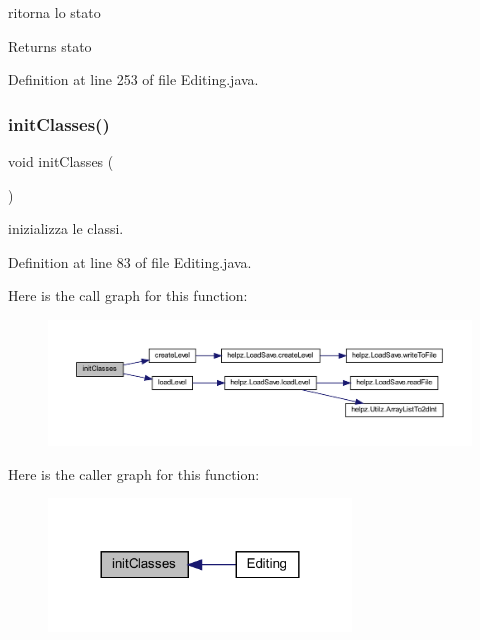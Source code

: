 ritorna lo stato 

\begin{DoxyReturn}{Returns}
stato 
\end{DoxyReturn}


Definition at line 253 of file Editing.\+java.

\mbox{\label{classscenes_1_1_editing_afe125d345675ffefe8da7e96d39773f3}} 
\subsubsection{\texorpdfstring{init\+Classes()}{initClasses()}}
{\footnotesize\ttfamily void init\+Classes (\begin{DoxyParamCaption}{ }\end{DoxyParamCaption})}



inizializza le classi. 



Definition at line 83 of file Editing.\+java.

Here is the call graph for this function\+:\nopagebreak
\begin{figure}[H]
\begin{center}
\leavevmode
\includegraphics[width=350pt]{classscenes_1_1_editing_afe125d345675ffefe8da7e96d39773f3_cgraph}
\end{center}
\end{figure}
Here is the caller graph for this function\+:\nopagebreak
\begin{figure}[H]
\begin{center}
\leavevmode
\includegraphics[width=228pt]{classscenes_1_1_editing_afe125d345675ffefe8da7e96d39773f3_icgraph}
\end{center}
\end{figure}
\mbox{\label{classscenes_1_1_editing_a286931cc46e197f4a85af7229fdc29a4}} 
